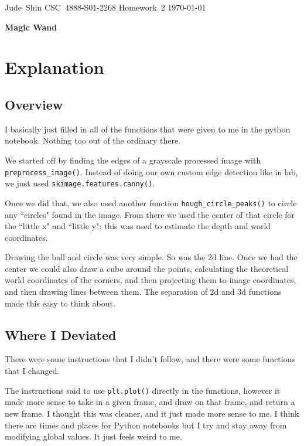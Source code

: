 \documentclass[11pt]{article}
\begin{document}
\hfill\vbox{\hbox{Jude Shin}
		\hbox{CSC 4888-S01-2268}	
		\hbox{Homework 2}	
		\hbox{\today}}\par

\bigskip
\centerline{\Large\bf Magic Wand}\par
\bigskip

\section{Explanation}

\subsection{Overview}

I basically just filled in all of the functions that were given to me in the python notebook.
Nothing too out of the ordinary there.

We started off by finding the edges of a grayscale processed image with \lstinline{preprocess_image()}.
Instead of doing our own custom edge detection like in lab, we just used \lstinline{skimage.features.canny()}.

Once we did that, we also used another function \lstinline{hough_circle_peaks()} to circle any ``circles" found in the image.
From there we used the center of that circle for the ``little x" and ``little y"; this was used to estimate the depth and world coordinates.

Drawing the ball and circle was very simple.
So was the 2d line.
Once we had the center we could also draw a cube around the points, calculating the theoretical world coordinates of the corners, and then projecting them to image coordinates, and then drawing lines between them.
The separation of 2d and 3d functions made this easy to think about.

\subsection{Where I Deviated}

There were some instructions that I didn't follow, and there were some functions that I changed.

The instructions said to use \lstinline{plt.plot()} directly in the functions, however it made more sense to take in a given frame, and draw on that frame, and return a new frame.
I thought this was cleaner, and it just made more sense to me.
I think there are times and places for Python notebooks but I try and stay away from modifying global values.
It just feels weird to me.
\end{document}

